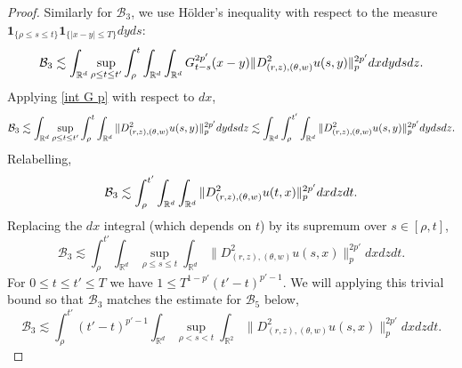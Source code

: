 \documentclass[10pt,a4paper]{amsart}
\def\bR{\mathbb{R}}
\def\cB{\mathcal{B}}
\newcommand{\les}{\lesssim}
\begin{document}
\begin{proof}
Similarly for $\cB_3$, we use H\"older's inequality with respect to the measure $\mathbf 1_{\{\rho \leq s \leq t\}} \mathbf 1_{\{|x-y| \leq T\}}dyds$:
\[
 \cB_3 \les \int_{\bR^d} \sup_{\rho \leq t \leq t'} \int_\rho^t \int_{\bR^d} \int_{\bR^d} G^{2p'}_{t-s}(x-y) \|D^2_{(r,z),(\theta,w)}u(s,y)\|^{2p'}_{p}  dx dy ds dz. \\
\]
Applying \eqref{int G p} with respect to $dx$,
\[
 \cB_3 \les \int_{\bR^d} \sup_{\rho \leq t\leq t'} \int_\rho^t \int_{\bR^d} \|D^2_{(r,z),(\theta,w)}u(s,y)\|^{2p'}_{p} dy ds dz \les \int_{\bR^d} \int_\rho^{t'} \int_{\bR^d} \|D^2_{(r,z),(\theta,w)}u(s,y)\|^{2p'}_{p} dy ds dz. \\
\]
Relabelling, 
\[
 \cB_3 \les \int_\rho^{t'} \int_{\bR^d} \int_{\bR^d} \|D^2_{(r,z),(\theta,w)}u(t,x)\|^{2p'}_{p} dx dz dt. \\
\]
Replacing the $dx$ integral (which depends on $t$) by its supremum over $s \in [\rho, t]$,
\[
 \cB_3 \les \int_\rho^{t'} \int_{\bR^d} \sup_{\rho \leq s \leq t} \int_{\bR^d} \|D^2_{(r,z),(\theta,w)}u(s,x)\|^{2p'}_{p} dx dz dt. 
\]
For $0 \leq t \leq t' \leq T$ we have $1 \leq T^{1-p'}(t'-t)^{p'-1}$. We will applying this trivial bound so that $\cB_3$ matches the estimate for $\cB_5$ below, 
\[
 \cB_3 \les \int_\rho^{t'} (t'-t)^{p'-1} \int_{\bR^d} \sup_{\rho<s<t} \int_{\bR^2} \|D^2_{(r,z),(\theta,w)}u(s,x)\|^{2p'}_{p} dx dz dt.
\]


\end{proof}
\end{document}
